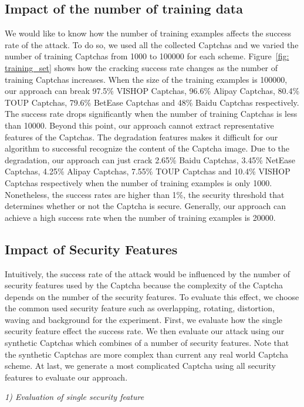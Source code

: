\subsection{Impact of the number of training data}
We would like to know how the number of training examples affects the success rate of the attack. To do so, we used all the collected Captchas and we varied the number of training Captchas from 1000 to 100000 for each scheme. Figure~\ref{fig: training_set} shows how the cracking success rate changes as the number of training Captchas increases. When the size of the training examples is 100000, our approach can break 97.5\% VISHOP Captchas, 96.6\% Alipay Captchas, 80.4\% TOUP Captchas, 79.6\% BetEase Captchas and 48\% Baidu Captchas respectively. The success rate drops significantly when the number of training Captchas is less than 10000. Beyond this point, our approach cannot extract representative features of the Captchas. The degradation features makes it difficult for our algorithm to successful recognize the content of the Captcha image.
Due to the degradation, our approach can just crack 2.65\% Baidu Captchas, 3.45\% NetEase Captchas, 4.25\% Alipay Captchas, 7.55\% TOUP Captchas and 10.4\% VISHOP Captchas respectively when the number of training examples is only 1000. Nonetheless, the success rates are higher than 1\%, the security threshold that determines whether or not the Captcha is secure.
Generally, our approach can achieve a high success rate when the number of training examples is 20000.

\subsection{Impact of Security Features}
Intuitively, the success rate of the attack would be influenced by the number of security features used by the Captcha because the complexity of the Captcha depends on the number of the security features. To evaluate this effect, we choose the common used security feature such as overlapping, rotating, distortion, waving and background for the experiment.
First, we evaluate how the single security feature effect the success rate. We then evaluate our attack using our synthetic Captchas which combines of a number of security features. Note that the synthetic Captchas are more complex than current any real world Captcha scheme. At last, we generate a most complicated Captcha using all security features to evaluate our approach.

\noindent \emph{1) Evaluation of single security feature}


